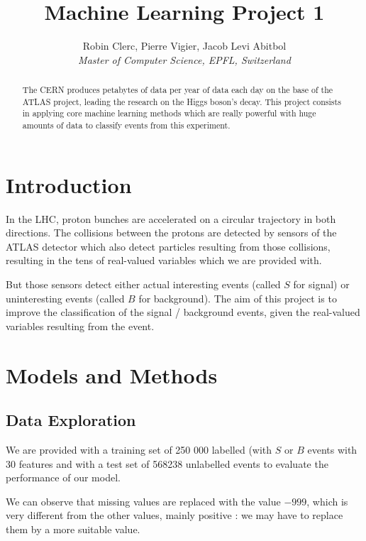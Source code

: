 \documentclass[10pt,conference,compsocconf]{IEEEtran}
\begin{document}
\title{Machine Learning Project 1}

\author{
  Robin Clerc, Pierre Vigier, Jacob Levi Abitbol\\
  \textit{Master of Computer Science, EPFL, Switzerland}
}

\maketitle

\begin{abstract}
  The CERN produces petabytes of data per year of data each day on the base of the ATLAS project, leading the research on the Higgs boson's decay.
  This project consists in applying core machine learning methods which are really powerful with huge amounts of data to classify events from this experiment.
\end{abstract}

\section{Introduction}

In the LHC, proton bunches are accelerated on a circular trajectory in both directions. The collisions between the protons are detected by sensors of the ATLAS detector which also detect particles resulting from those collisions, resulting in the tens of real-valued variables which we are provided with.

But those sensors detect either actual interesting events (called $S$ for signal) or uninteresting events (called $B$ for background). The aim of this project is to improve the classification of the signal / background events, given the real-valued variables resulting from the event.


\section{Models and Methods}
\label{sec:structure-paper}

\subsection{Data Exploration}

We are provided with a training set of 250 000 labelled (with $S$ or $B$ events with 30 features and with a test set of 568238 unlabelled events to evaluate the performance of our model.

We can observe that missing values are replaced with the value $-999$, which is very different from the other values, mainly positive : we may have to replace them by a more suitable value.
\end{document}
